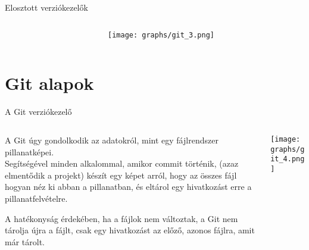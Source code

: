 \documentclass[english, aspectratio=169]{beamer}
\makeatletter
\let\origtableofcontents=\tableofcontents
\def\tableofcontents{\@ifnextchar[{\origtableofcontents}{\gobbletableofcontents}}
\def\gobbletableofcontents#1{\origtableofcontents}
\makeatother
\begin{document}
\begin{frame}{Elosztott verziókezelők}
\begin{columns}
\begin{column}{0.5\textwidth}
\end{column}
\begin{column}{0.5\textwidth}
\begin{center}
\texttt{[image: graphs/git\_3.png]}
\end{center}
\end{column}
\end{columns}
\end{frame}

\section{Git alapok}

\begin{frame}
	\tableofcontents[currentsection]
\end{frame}

\begin{frame}{A Git verziókezelő}
\begin{columns}
\begin{column}{0.5\textwidth}
A Git úgy gondolkodik az adatokról, mint egy fájlrendszer pillanatképei. 
\\Segítségével minden alkalommal, amikor commit történik, (azaz elmentődik a projekt) készít egy képet arról, hogy az összes fájl hogyan néz ki abban a pillanatban, és eltárol egy hivatkozást erre a pillanatfelvételre. \par\smallskip
A hatékonyság érdekében, ha a fájlok nem változtak, a Git nem tárolja újra a fájlt, csak egy hivatkozást az előző, azonos fájlra, amit már tárolt.
\end{column}
\begin{column}{0.5\textwidth}
\begin{center}
\texttt{[image: graphs/git\_4.png]}
\end{center}
\end{column}
\end{columns}
\end{frame}
\end{document}

